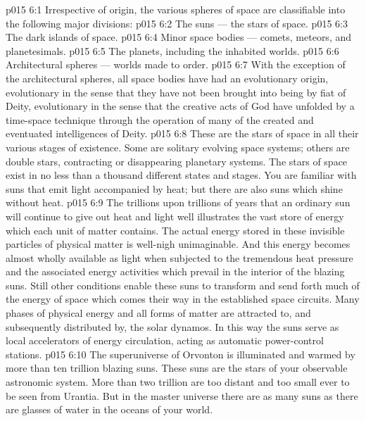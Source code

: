 \vs p015 6:1 Irrespective of origin, the various spheres of space are classifiable into the following major divisions:
\vs p015 6:2 \bibnobreakspace The suns --- the stars of space.
\vs p015 6:3 \bibnobreakspace The dark islands of space.
\vs p015 6:4 \bibnobreakspace Minor space bodies --- comets, meteors, and planetesimals.
\vs p015 6:5 \bibnobreakspace The planets, including the inhabited worlds.
\vs p015 6:6 \bibnobreakspace Architectural spheres --- worlds made to order.
\vs p015 6:7 \pc With the exception of the architectural spheres, all space bodies have had an evolutionary origin, evolutionary in the sense that they have not been brought into being by fiat of Deity, evolutionary in the sense that the creative acts of God have unfolded by a time\hyp{}space technique through the operation of many of the created and eventuated intelligences of Deity.
\vs p015 6:8 \pc {} These are the stars of space in all their various stages of existence. Some are solitary evolving space systems; others are double stars, contracting or disappearing planetary systems. The stars of space exist in no less than a thousand different states and stages. You are familiar with suns that emit light accompanied by heat; but there are also suns which shine without heat.
\vs p015 6:9 The trillions upon trillions of years that an ordinary sun will continue to give out heat and light well illustrates the vast store of energy which each unit of matter contains. The actual energy stored in these invisible particles of physical matter is well\hyp{}nigh unimaginable. And this energy becomes almost wholly available as light when subjected to the tremendous heat pressure and the associated energy activities which prevail in the interior of the blazing suns. Still other conditions enable these suns to transform and send forth much of the energy of space which comes their way in the established space circuits. Many phases of physical energy and all forms of matter are attracted to, and subsequently distributed by, the solar dynamos. In this way the suns serve as local accelerators of energy circulation, acting as automatic power\hyp{}control stations.
\vs p015 6:10 The superuniverse of Orvonton is illuminated and warmed by more than ten trillion blazing suns. These suns are the stars of your observable astronomic system. More than two trillion are too distant and too small ever to be seen from Urantia. But in the master universe there are as many suns as there are glasses of water in the oceans of your world.
